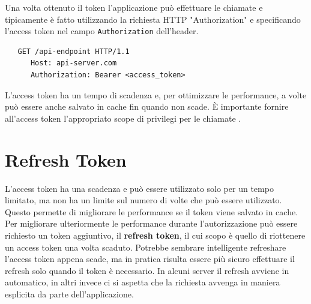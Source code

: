 Una volta ottenuto il token l'applicazione può effettuare le chiamate \api{} e tipicamente
è fatto utilizzando la richiesta HTTP "Authorization" e specificando l'access token
nel campo \verb|Authorization| dell'header.

\begin{lstlisting}
   GET /api-endpoint HTTP/1.1
      Host: api-server.com
      Authorization: Bearer <access_token>
\end{lstlisting}

L'access token ha un tempo di scadenza e, per ottimizzare le performance, a volte
può essere anche salvato in cache fin quando non scade. È importante fornire
all'access token  l'appropriato scope di privilegi per le chiamate \api{}.

\section{Refresh Token}

L'access token ha una scadenza e può essere utilizzato solo per un tempo limitato,
ma non ha un limite sul numero di volte che può essere utilizzato.
Questo permette di migliorare le performance se il token viene salvato in cache.
Per migliorare ulteriormente le performance durante l'autorizzazione può essere
richiesto un token aggiuntivo, il \textbf{refresh token}, il cui scopo è quello di
riottenere un access token una volta scaduto. Potrebbe sembrare intelligente
refreshare l'access token appena scade, ma in pratica risulta essere più sicuro
effettuare il refresh solo quando il token è necessario.
In alcuni server il refresh avviene in automatico, in altri invece ci si aspetta
che la richiesta avvenga in maniera esplicita da parte dell'applicazione.